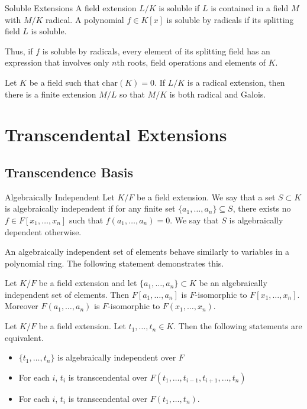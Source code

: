 \documentclass[a4paper]{article}
\begin{document}
\begin{defn}{Soluble Extensions}{} A field extension $L/K$ is soluble if $L$ is contained in a field $M$ with $M/K$ radical. A polynomial $f\in K[x]$ is soluble by radicals if its splitting field $L$ is soluble. 
\end{defn}

Thus, if $f$ is soluble by radicals, every element of its splitting field has an expression that involves only $n$th roots, field operations and elements of $K$. 

\begin{prp}{}{} Let $K$ be a field such that $\text{char}(K)=0$. If $L/K$ is a radical extension, then there is a finite extension $M/L$ so that $M/K$ is both radical and Galois. 
\end{prp}

\pagebreak
\section{Transcendental Extensions}
\subsection{Transcendence Basis}
\begin{defn}{Algebraically Independent}{} Let $K/F$ be a field extension. We say that a set $S\subset K$ is algebraically independent if for any finite set $\{a_1,\dots,a_n\}\subseteq S$, there exists no $f\in F[x_1,\dots,x_n]$ such that $f(a_1,\dots,a_n)=0$. We say that $S$ is algebraically dependent otherwise. 
\end{defn}

An algebraically independent set of elements behave similarly to variables in a polynomial ring. The following statement demonstrates this. 

\begin{lmm}{}{} Let $K/F$ be a field extension and let $\{a_1,\dots,a_n\}\subset K$ be an algebraically independent set of elements. Then $F[a_1,\dots,a_n]$ is $F$-isomorphic to $F[x_1,\dots,x_n]$. Moreover $F(a_1,\dots,a_n)$ is $F$-isomorphic to $F(x_1,\dots,x_n)$. 
\end{lmm}

\begin{prp}{}{} Let $K/F$ be a field extension. Let $t_1,\dots,t_n\in K$. Then the following statements are equivalent. 
\begin{itemize}
\item $\{t_1,\dots,t_n\}$ is algebraically independent over $F$
\item For each $i$, $t_i$ is transcendental over $F(t_1,\dots,t_{i-1},t_{i+1},\dots,t_n)$
\item For each $i$, $t_i$ is transcendental over $F(t_1,\dots,t_n)$. 
\end{itemize}
\end{prp}
\end{document}
